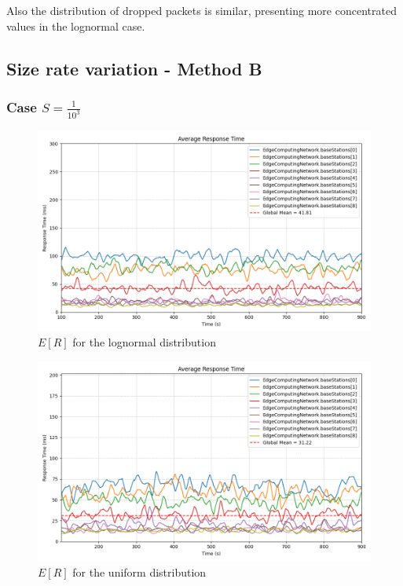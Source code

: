 \documentclass{report}
\begin{document}
\begin{flushleft}
Also the distribution of dropped packets is similar, presenting more concentrated values in the lognormal case.
\end{flushleft}

\subsection{Size rate variation - Method B}
\subsubsection*{Case $S=\frac{1}{10^3}$}

\begin{figure}[H]
    \centering
    \includegraphics[width=\textwidth]{img/plots/log_1e3_B/resptime.png}
    \caption{$E[R]$ for the lognormal distribution}
\end{figure}

\begin{figure}[H]
    \centering
    \includegraphics[width=\textwidth]{img/plots/uni_1e3_B/resptime.png}
    \caption{$E[R]$ for the uniform distribution}
\end{figure}
\end{document}
